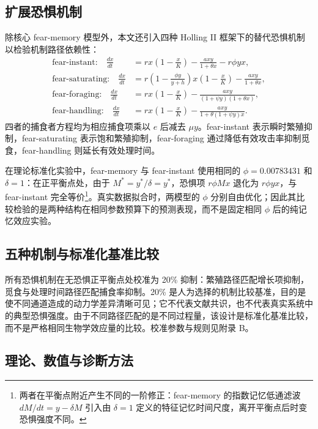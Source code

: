 \documentclass[12pt,a4paper]{ctexart}
\begin{document}
\subsection{扩展恐惧机制}

除核心 fear-memory 模型外，本文还引入四种 Holling II 框架下的替代恐惧机制以检验机制路径依赖性：
\begin{align}
 \text{fear-instant:}\quad
 \frac{dx}{dt}&=rx\left(1-\frac{x}{K}\right)-\frac{axy}{1+\theta x}-r\phi yx, \label{eq:instant}\\
 \text{fear-saturating:}\quad
 \frac{dx}{dt}&=r\left(1-\frac{\phi y}{y+h}\right)x\left(1-\frac{x}{K}\right)-\frac{axy}{1+\theta x}, \label{eq:saturating}\\
 \text{fear-foraging:}\quad
 \frac{dx}{dt}&=rx\left(1-\frac{x}{K}\right)-\frac{a x y}{(1+\psi y)(1+\theta x)}, \label{eq:foraging}\\
 \text{fear-handling:}\quad
 \frac{dx}{dt}&=rx\left(1-\frac{x}{K}\right)-\frac{a x y}{1+\theta(1+\psi y)x}. \label{eq:handling}
\end{align}
四者的捕食者方程均为相应捕食项乘以 $e$ 后减去 $\mu y$。fear-instant 表示瞬时繁殖抑制，fear-saturating 表示饱和繁殖抑制，fear-foraging 通过降低有效攻击率抑制觅食，fear-handling 则延长有效处理时间。

在理论标准化实验中，fear-memory 与 fear-instant 使用相同的 $\phi=0.00783431$ 和 $\delta=1$：在正平衡点处，由于 $M^*=y^*/\delta=y^*$，恐惧项 $r\phi M x$ 退化为 $r\phi y x$，与 fear-instant 完全等价\footnote{两者在平衡点附近产生不同的一阶修正：fear-memory 的指数记忆低通滤波 $dM/dt = y-\delta M$ 引入由 $\delta=1$ 定义的特征记忆时间尺度，离开平衡点后时变恐惧强度不同。}。真实数据拟合时，两模型的 $\phi$ 分别自由优化；因此其比较检验的是两种结构在相同参数预算下的预测表现，而不是固定相同 $\phi$ 后的纯记忆效应实验。

\subsection{五种机制与标准化基准比较}

所有恐惧机制在无恐惧正平衡点处校准为 20\% 抑制：繁殖路径匹配增长项抑制，觅食与处理时间路径匹配捕食率抑制。20\% 是人为选择的机制比较基准，目的是使不同通道造成的动力学差异清晰可见；它不代表文献共识，也不代表真实系统中的典型恐惧强度。由于不同路径匹配的是不同过程量，该设计是标准化基准比较，而不是严格相同生物学效应量的比较。校准参数与规则见附录 B。

\subsection{理论、数值与诊断方法}
\end{document}
